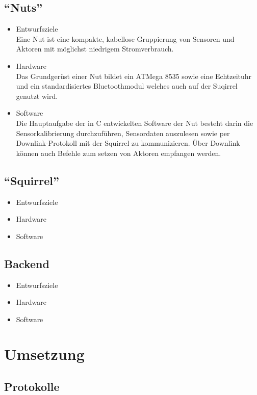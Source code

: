 \documentclass[12pt,a4paper]{article}
\begin{document}
\subsection{``Nuts''}
\begin{itemize}
	\item Entwurfsziele\\
	Eine Nut ist eine kompakte, kabellose Gruppierung von Sensoren und Aktoren mit möglichst niedrigem Stromverbrauch.
	\item Hardware\\
	Das Grundgerüst einer Nut bildet ein ATMega 8535 sowie eine Echtzeituhr und ein standardisiertes Bluetoothmodul welches auch auf der Suqirrel genutzt wird.
	\item Software\\
	Die Hauptaufgabe der in C entwickelten Software der Nut besteht darin die Sensorkalibrierung durchzuführen, Sensordaten auszulesen sowie per Downlink-Protokoll mit der Squirrel zu kommunizieren. Über Downlink können auch Befehle zum setzen von Aktoren empfangen werden.
\end{itemize}
\subsection{``Squirrel''}
\begin{itemize}
	\item Entwurfsziele\\
	
	\item Hardware\\
	
	\item Software\\
	
\end{itemize}
\subsection{Backend}
\begin{itemize}
	\item Entwurfsziele
	\item Hardware
	\item Software
\end{itemize}
\section{Umsetzung}
\subsection{Protokolle}
\end{document}
